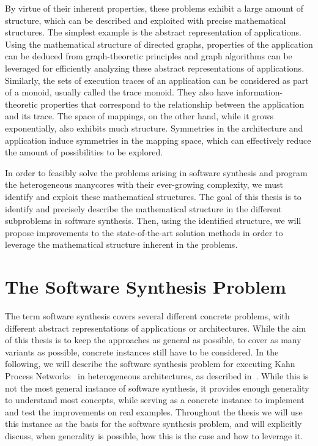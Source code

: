 \documentclass[sigplan,10pt]{acmart}
\begin{document}
By virtue of their inherent properties, these problems exhibit a large amount of structure, which can be described and exploited with precise mathematical structures.
The simplest example is the abstract representation of applications.
Using the mathematical structure of directed graphs, properties of the application can be deduced from graph-theoretic principles and graph algorithms can be leveraged for efficiently analyzing these abstract representations of applications.
Similarly, the sets of execution traces of an application can be considered as part of a monoid, usually called the trace monoid. They also have information-theoretic properties that correspond to the relationship between the application and its trace.
The space of mappings, on the other hand, while it grows exponentially, also exhibits much structure. Symmetries in the architecture and application induce symmetries in the mapping space, which can effectively reduce the amount of possibilities to be explored.

In order to feasibly solve the problems arising in software synthesis and program the heterogeneous manycores with their ever-growing complexity, we must identify and exploit these mathematical structures. The goal of this thesis is to identify and precisely describe 
the mathematical structure in the different subproblems in software synthesis. Then, using the identified structure, we will propose improvements to the state-of-the-art solution methods in order to leverage the mathematical structure inherent in the problems.


\section{The Software Synthesis Problem}

The term software synthesis covers several different concrete problems, with different abstract representations of applications or architectures.
While the aim of this thesis is to keep the approaches as general as possible, to cover as many variants as possible, concrete instances still have to be considered.
In the following, we will describe the software synthesis problem for executing Kahn Process Networks~\cite{kahn74} in heterogeneous architectures, as described in~\cite{castrillon14_springer}.
While this is not the most general instance of software synthesis, it provides enough generality to understand most concepts, while serving as a concrete instance to implement and test the improvements on real examples.
Throughout the thesis we will use this instance as the basis for the software synthesis problem, and will explicitly discuss, when generality is possible, how this is the case and how to leverage it.
\end{document}
